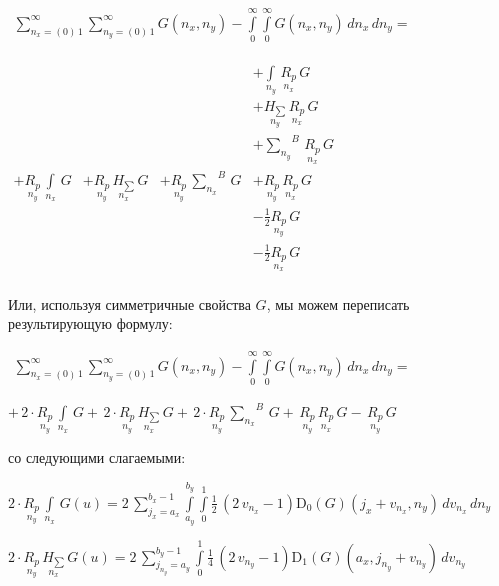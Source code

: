 \documentclass[11pt]{article}
\begin{document}
    \(\begin{array}{r} \sum\limits_{n_x=\left(0\right)\,1}^{\infty} \sum\limits_{n_y=\left(0\right)\,1}^{\infty} G\left(n_x, n_y\right) - \int\limits_{0}^{\infty} \int\limits_{0}^{\infty} G\left(n_x, n_y\right)\,d{n_x}\,d{n_y} = \end{array}\)

    \(\begin{array}{llll}  \,&  \,&  \,&  + \int\limits_{n_y}^{}\,\underset{n_x}{R_{p}}\,G \\  \,&  \,&  \,&  + \underset{n_y}{H_{\sum}}\,\underset{n_x}{R_{p}}\,G \\  \,&  \,&  \,&  + {\sum\limits_{n_y}^{}}^{B}\,\underset{n_x}{R_{p}}\,G \\  + \underset{n_y}{R_{p}}\,\int\limits_{n_x}^{}\,G &  + \underset{n_y}{R_{p}}\,\underset{n_x}{H_{\sum}}\,G &  + \underset{n_y}{R_{p}}\,{\sum\limits_{n_x}^{}}^{B}\,G &  + \underset{n_y}{R_{p}}\,\underset{n_x}{R_{p}}\,G \\  \,&  \,&  \,&  - \frac{1}{2}\underset{n_y}{R_{p}}\,G \\  \,&  \,&  \,&  - \frac{1}{2}\underset{n_x}{R_{p}}\,G \\ \end{array}\)

    Или, используя симметричные свойства \(G\), мы можем переписать
результирующую формулу:

    \(\begin{array}{r} \sum\limits_{n_x=\left(0\right)\,1}^{\infty} \sum\limits_{n_y=\left(0\right)\,1}^{\infty} G\left(n_x, n_y\right) - \int\limits_{0}^{\infty} \int\limits_{0}^{\infty} G\left(n_x, n_y\right)\,d{n_x}\,d{n_y} = \end{array}\)

    \(+\,2\cdot\underset{n_y}{R_{p}}\,\int\limits_{n_x}^{}\,G +\,2\cdot\underset{n_y}{R_{p}}\,\underset{n_x}{H_{\sum}}\,G +\,2\cdot\underset{n_y}{R_{p}}\,{\sum\limits_{n_x}^{}}^{B}\,G +\,\underset{n_y}{R_{p}}\,\underset{n_x}{R_{p}}\,G -\,\underset{n_y}{R_{p}}\,G\)

    со следующими слагаемыми:

\(2\cdot\underset{n_y}{R_{p}}\,\int\limits_{n_x}^{}\,G\left(u\right) = 2 \, {\sum\limits_{j_{x}=a_{x}}^{b_{x} - 1} \int\limits_{a_{y}}^{b_{y}} \int\limits_{0}^{1} \frac{1}{2} \, {\left(2 \, v_{n_{x}} - 1\right)} \mathrm{D}_{0}\left(G\right)\left(j_{x} + v_{n_{x}}, n_{y}\right)\,{d v_{n_{x}}}\,{d n_{y}}}\)

\(2\cdot\underset{n_y}{R_{p}}\,\underset{n_x}{H_{\sum}}\,G\left(u\right) = 2 \, {\sum\limits_{j_{n_{y}}=a_{y}}^{b_{y} - 1} \int\limits_{0}^{1} \frac{1}{4} \, {\left(2 \, v_{n_{y}} - 1\right)} \mathrm{D}_{1}\left(G\right)\left(a_{x}, j_{n_{y}} + v_{n_{y}}\right)\,{d v_{n_{y}}}}\)
\end{document}
